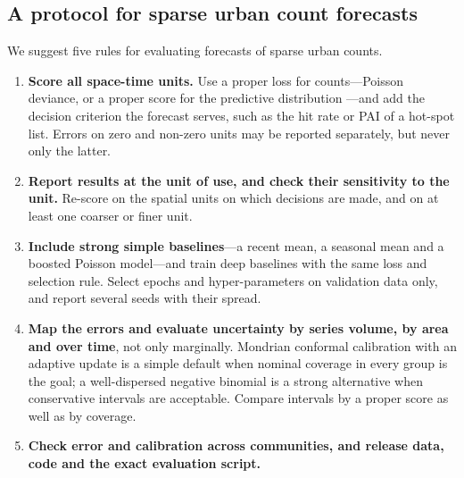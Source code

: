 \documentclass[preprint,12pt,authoryear]{elsarticle}
\begin{document}
\subsection{A protocol for sparse urban count forecasts}\label{sec:protocol}
We suggest five rules for evaluating forecasts of sparse urban counts.
\begin{enumerate}[leftmargin=*,itemsep=2pt]
\item \textbf{Score all space-time units.} Use a proper loss for counts---Poisson deviance, or a proper score for the predictive distribution \citep{czado2009predictive}---and add the decision criterion the forecast serves, such as the hit rate or PAI of a hot-spot list. Errors on zero and non-zero units may be reported separately, but never only the latter.
\item \textbf{Report results at the unit of use, and check their sensitivity to the unit.} Re-score on the spatial units on which decisions are made, and on at least one coarser or finer unit.
\item \textbf{Include strong simple baselines}---a recent mean, a seasonal mean and a boosted Poisson model---and train deep baselines with the same loss and selection rule. Select epochs and hyper-parameters on validation data only, and report several seeds with their spread.
\item \textbf{Map the errors and evaluate uncertainty by series volume, by area and over time}, not only marginally. Mondrian conformal calibration with an adaptive update is a simple default when nominal coverage in every group is the goal; a well-dispersed negative binomial is a strong alternative when conservative intervals are acceptable. Compare intervals by a proper score as well as by coverage.
\item \textbf{Check error and calibration across communities, and release data, code and the exact evaluation script.}
\end{enumerate}
\end{document}
